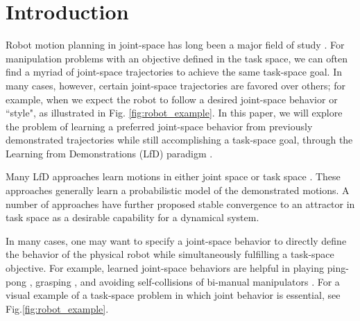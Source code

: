 \documentclass[letterpaper, 10 pt, conference,fleqn]{ieeeconf}
\begin{document}

\IEEEpeerreviewmaketitle
\section{Introduction}
\label{sec:intro}
Robot motion planning in joint-space has long been a major field of study \cite{kelly2006control}. For manipulation problems with an objective defined in the task space, %
 we can often find a myriad of joint-space trajectories to achieve the same task-space goal. In many cases, however, certain joint-space trajectories are favored over others; for example, when we expect the robot to follow a desired joint-space behavior or ``style", as illustrated in Fig. \ref{fig:robot_example}. In this paper, we will explore the problem of learning a preferred joint-space behavior from previously demonstrated trajectories while still accomplishing a task-space goal, through the Learning from Demonstrations (LfD) paradigm \cite{billard2008robot,Argall:RAS:2009}.

Many LfD approaches learn motions in either joint space %
\cite{Garrido:Neuro:2015,Schaal:AI:2002} or task space %
\cite{Pastor:ICRA:2009,Calinon:ISR:2015}. These approaches generally learn a probabilistic model of the demonstrated motions. %
A number of approaches have further proposed stable convergence to an attractor in task space %
 \cite{khansari2011learning, Neumann:RAS:2015}as a desirable capability for a dynamical system.

	In many cases, one may want to specify a joint-space behavior to directly define the behavior of the physical robot while simultaneously fulfilling a task-space objective. For example, %
learned joint-space behaviors are helpful in playing ping-pong \cite{huang2016jointly}, grasping \cite{calinon2010learning}, and avoiding self-collisions of bi-manual manipulators \cite{silverio2017learning}. For a visual example of a task-space problem in which joint behavior is essential, see Fig.\ref{fig:robot_example}.
\end{document}
